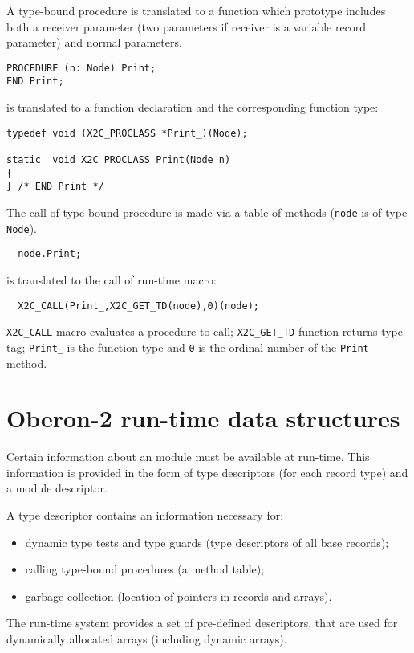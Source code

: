 A   type-bound  procedure  is  translated  to  a  function  which
prototype  includes  both a receiver  parameter (two parameters if
receiver is a variable record parameter) and normal parameters.
\begin{verbatim}
PROCEDURE (n: Node) Print;
END Print;
\end{verbatim}
is translated to a function declaration and the corresponding function type:
\begin{verbatim}
typedef void (X2C_PROCLASS *Print_)(Node);

static  void X2C_PROCLASS Print(Node n)
{
} /* END Print */
\end{verbatim}

The call of type-bound procedure is made via a table of methods
({\tt node} is of type {\tt Node}).
\begin{verbatim}
  node.Print;
\end{verbatim}
is translated to the call of run-time macro:
\begin{verbatim}
  X2C_CALL(Print_,X2C_GET_TD(node),0)(node);
\end{verbatim}
\verb+X2C_CALL+ macro evaluates a procedure to call;
\verb+X2C_GET_TD+ function returns type tag;
\verb+Print_+ is the function type and {\tt 0} is the ordinal number
of the {\tt Print} method.

\section{Oberon-2 run-time data structures}\label{maptoc:runtimedata}

Certain  information  about an \ot{}  module must be available at
run-time.  This  information  is  provided  in  the  form of type
descriptors (for each record type) and a module descriptor.

A type descriptor contains an information necessary for:
\begin{itemize}
\item dynamic type tests and type guards (type descriptors
        of all base records);
\item calling type-bound procedures (a method table);
\item garbage collection (location of pointers in records and arrays).
\end{itemize}

The  run-time  system  provides a set of pre-defined descriptors,
that are used for dynamically allocated arrays (including dynamic
arrays).


